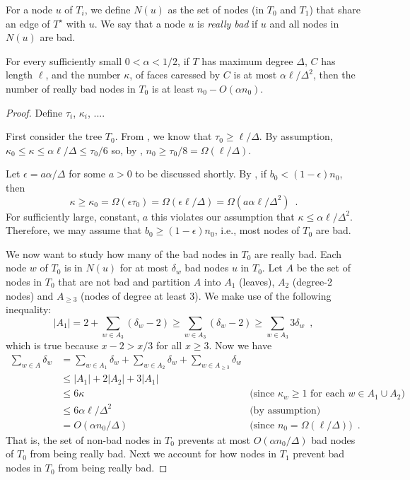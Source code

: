 \documentclass{patmorin}
\newcommand{\dual}[1]{{#1}^\star}
\begin{document}
For a node $u$ of $T_i$, we define $N(u)$ as the set of nodes (in $T_0$
and $T_1$) that share an edge of $\dual{T}$ with $u$.  We say that a
node $u$ is \emph{really bad} if $u$ and all nodes in $N(u)$ are bad.

\begin{lem}
  For every sufficiently small $0<\alpha < 1/2$,  
  if $T$ has maximum degree $\Delta$, $C$ has length $\ell$, and the number
  $\kappa$, of faces caressed by $C$ is at most $\alpha\ell/\Delta^2$, then
  the number of really bad nodes in $T_0$ is at least $n_0-O(\alpha n_0)$.
\end{lem}

\begin{proof}
  Define $\tau_i$, $\kappa_i$, ....

  First consider the tree $T_0$.  From ,
  we know that $\tau_0\ge \ell/\Delta$.  By assumption,
  $\kappa_0\le\kappa\le \alpha\ell/\Delta \le \tau_0/6$
  so, by , $n_0 \ge
  \tau_0/8=\Omega(\ell/\Delta)$.
  
  Let $\epsilon=a\alpha/\Delta$ for some $a>0$ to be discussed shortly.
  By , if $b_0 < (1-\epsilon) n_0$, then
  \[ 
      \kappa \ge \kappa_0 = \Omega(\epsilon\tau_0)
               = \Omega(\epsilon\ell/\Delta)
               = \Omega(a\alpha\ell/\Delta^2) 
               \enspace .
  \]
  For sufficiently large, constant, $a$ this violates our assumption
  that $\kappa \le \alpha\ell/\Delta^2$.
  Therefore, we may assume that $b_0\ge (1-\epsilon)n_0$, i.e., most nodes
  of $T_0$ are bad.

  We now want to study how many of the bad nodes in $T_0$ are really bad.
  Each node $w$ of $T_0$ is in $N(u)$ for at most $\delta_w$ bad nodes
  $u$ in $T_0$.  Let $A$ be the set of nodes in $T_0$ that are not
  bad and partition $A$ into $A_1$ (leaves), $A_2$ (degree-2 nodes)
  and $A_{\ge 3}$ (nodes of degree at least 3).  We make use of the
  following inequality:
  \[  |A_1| = 2 + \sum_{w\in A_3}(\delta_w-2) \ge \sum_{w\in A_3}(\delta_w-2)
    \ge \sum_{w\in A_3}3\delta_w \enspace , \] 
  which is true because $x-2>x/3$ for all $x\ge 3$. 
  Now we have 
  \begin{align*}
   \sum_{w\in A}\delta_w 
    & = \sum_{w\in A_1}\delta_w 
         + \sum_{w\in A_2}\delta_w 
         + \sum_{w\in A_{\ge 3}}\delta_w \\
    & \le |A_1| + 2|A_2| + 3|A_1| \\
    & \le 6\kappa & \text{(since $\kappa_w\ge 1$ for each $w\in A_1\cup A_2$)}\\
    & \le 6\alpha\ell/\Delta^2 & \text{(by assumption)}\\
    & = O(\alpha n_0/\Delta) & \text{(since $n_0=\Omega(\ell/\Delta)$)}\enspace .
  \end{align*}
  That is, the set of non-bad nodes in $T_0$ prevents at most $O(\alpha
  n_0/\Delta)$ bad nodes of $T_0$ from being really bad. Next we account
  for how nodes in $T_1$ prevent bad nodes in $T_0$ from being really bad.


\end{proof}
\end{document}
